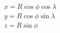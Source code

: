 \documentclass[preview]{standalone}
\begin{document}
\begin{align*}
x = R \cos\phi \cos\lambda \\ y = R \cos\phi \sin\lambda \\ z = R \sin\phi
\end{align*}
\end{document}
